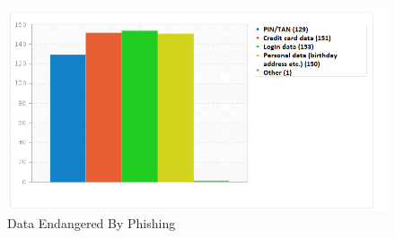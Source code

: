 \begin{figure}[hHtbp]
\includegraphics[width=1.0\textwidth]{graphix/endangered_data.png}%
\caption{Data Endangered By Phishing}%
\label{fig:endangered_data}%
\end{figure}
